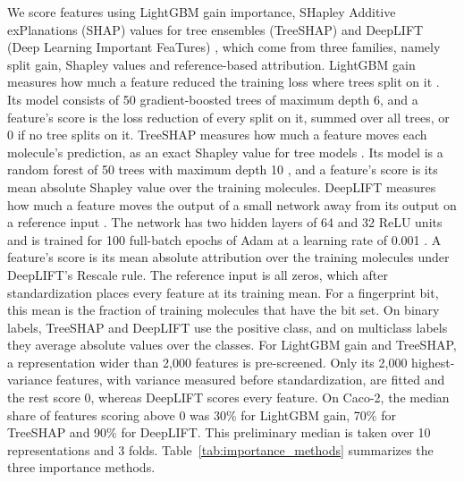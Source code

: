 We score features using LightGBM gain importance, SHapley Additive exPlanations (SHAP) values for tree ensembles (TreeSHAP) and DeepLIFT (Deep Learning Important FeaTures) \citep{Shrikumar2017}, which come from three families, namely split gain, Shapley values and reference-based attribution. LightGBM gain measures how much a feature reduced the training loss where trees split on it \citep{ke2017lightgbm}. Its model consists of 50 gradient-boosted trees of maximum depth 6, and a feature's score is the loss reduction of every split on it, summed over all trees, or 0 if no tree splits on it. TreeSHAP measures how much a feature moves each molecule's prediction, as an exact Shapley value for tree models \citep{Lundberg2020}. Its model is a random forest of 50 trees with maximum depth 10 \citep{Breiman2001}, and a feature's score is its mean absolute Shapley value over the training molecules. DeepLIFT measures how much a feature moves the output of a small network away from its output on a reference input \citep{Shrikumar2017, Kokhlikyan2020}. The network has two hidden layers of 64 and 32 ReLU units and is trained for 100 full-batch epochs of Adam at a learning rate of 0.001 \citep{Kingma2015}. A feature's score is its mean absolute attribution over the training molecules under DeepLIFT's Rescale rule. The reference input is all zeros, which after standardization places every feature at its training mean. For a fingerprint bit, this mean is the fraction of training molecules that have the bit set. On binary labels, TreeSHAP and DeepLIFT use the positive class, and on multiclass labels they average absolute values over the classes. For LightGBM gain and TreeSHAP, a representation wider than 2,000 features is pre-screened. Only its 2,000 highest-variance features, with variance measured before standardization, are fitted and the rest score 0, whereas DeepLIFT scores every feature. On Caco-2, the median share of features scoring above 0 was 30\% for LightGBM gain, 70\% for TreeSHAP and 90\% for DeepLIFT. This preliminary median is taken over 10 representations and 3 folds. Table~\ref{tab:importance_methods} summarizes the three importance methods.

